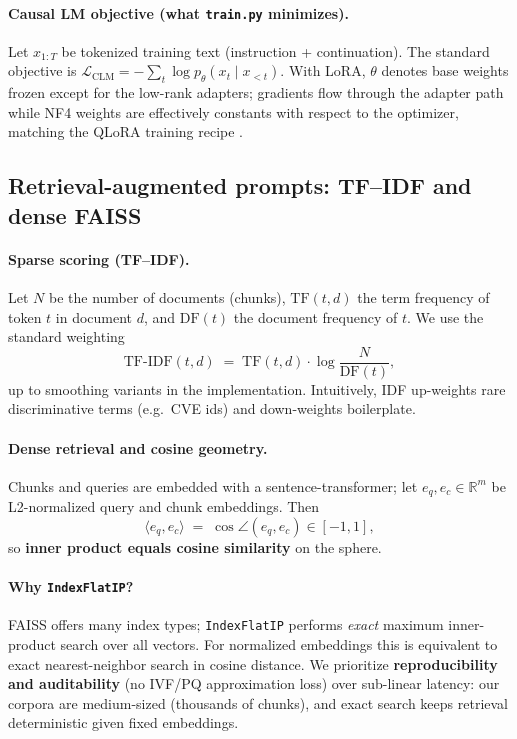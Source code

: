 \documentclass[11pt,a4paper]{article}
\begin{document}
\paragraph{Causal LM objective (what \texttt{train.py} minimizes).}
Let $x_{1:T}$ be tokenized training text (instruction + continuation).
The standard objective is $\mathcal{L}_{\mathrm{CLM}} = -\sum_t \log p_\theta(x_t \mid x_{<t})$.
With LoRA, $\theta$ denotes base weights frozen except for the low-rank adapters; gradients flow through the adapter path while NF4 weights are effectively constants with respect to the optimizer, matching the QLoRA training recipe \cite{dettmers2023qlora}.

\subsection{Retrieval-augmented prompts: TF--IDF and dense FAISS}
\label{sec:rag-theory}

\paragraph{Sparse scoring (TF--IDF).}
Let $N$ be the number of documents (chunks), $\mathrm{TF}(t,d)$ the term frequency of token $t$ in document $d$, and $\mathrm{DF}(t)$ the document frequency of $t$.
We use the standard weighting
\[
\mathrm{TF\text{-}IDF}(t,d) \;=\; \mathrm{TF}(t,d)\cdot \log\frac{N}{\mathrm{DF}(t)},
\]
up to smoothing variants in the implementation.
Intuitively, IDF up-weights rare discriminative terms (e.g.\ CVE ids) and down-weights boilerplate.

\paragraph{Dense retrieval and cosine geometry.}
Chunks and queries are embedded with a sentence-transformer; let $e_q, e_c \in \mathbb{R}^{m}$ be L2-normalized query and chunk embeddings.
Then
\[
\langle e_q, e_c \rangle \;=\; \cos\angle(e_q,e_c) \in [-1,1],
\]
so \textbf{inner product equals cosine similarity} on the sphere.

\paragraph{Why \texttt{IndexFlatIP}?}
FAISS offers many index types; \texttt{IndexFlatIP} performs \emph{exact} maximum inner-product search over all vectors.
For normalized embeddings this is equivalent to exact nearest-neighbor search in cosine distance.
We prioritize \textbf{reproducibility and auditability} (no IVF/PQ approximation loss) over sub-linear latency: our corpora are medium-sized (thousands of chunks), and exact search keeps retrieval deterministic given fixed embeddings.
\end{document}
